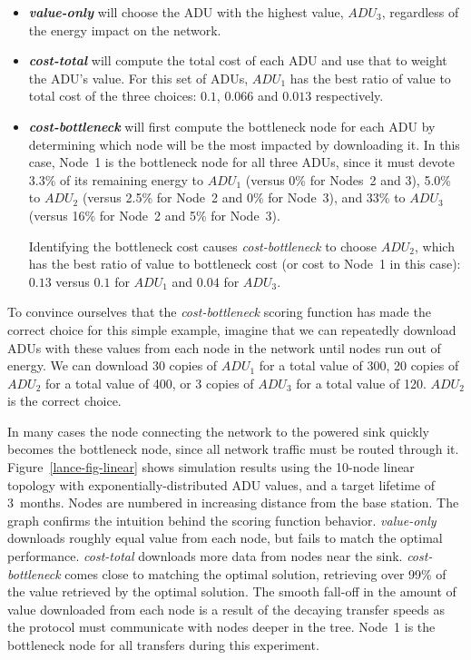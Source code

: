 \begin{itemize}

\item \textbf{\textit{value-only}} will choose the ADU with the highest
value, $ADU_3$, regardless of the energy impact on the network.

\item \textbf{\textit{cost-total}} will compute the total cost of each ADU
and use that to weight the ADU's value. For this set of ADUs, $ADU_1$ has the
best ratio of value to total cost of the three choices: $0.1$, $0.066$ and
$0.013$ respectively.

\item \textbf{\textit{cost-bottleneck}} will first compute the bottleneck
node for each ADU by determining which node will be the most impacted by
downloading it. In this case, Node~1 is the bottleneck node for all three
ADUs, since it must devote 3.3\% of its remaining energy to $ADU_1$ (versus
0\% for Nodes~2 and 3), 5.0\% to $ADU_2$ (versus 2.5\% for Node~2 and 0\% for
Node~3), and 33\% to $ADU_3$ (versus 16\% for Node~2 and 5\% for Node~3).

Identifying the bottleneck cost causes \textit{cost-bottleneck} to choose
$ADU_2$, which has the best ratio of value to  bottleneck cost (or cost to Node~1 in
this case): $0.13$ versus $0.1$ for $ADU_1$ and $0.04$ for $ADU_3$.

\end{itemize}

To convince ourselves that the \textit{cost-bottleneck} scoring function has
made the correct choice for this simple example, imagine that we can
repeatedly download ADUs with these values from each node in the network
until nodes run out of energy. We can download 30 copies of $ADU_1$ for a
total value of 300, 20 copies of $ADU_2$ for a total value of 400, or 3
copies of $ADU_3$ for a total value of 120. $ADU_2$ is the correct choice.

In many cases the node connecting the network to the powered sink quickly
becomes the bottleneck node, since all network traffic must be routed through
it. Figure~\ref{lance-fig-linear} shows simulation results using the 10-node
linear topology with exponentially-distributed ADU values, and a target
lifetime of 3~months. Nodes are numbered in increasing distance from the base
station. The graph confirms the intuition behind the scoring function
behavior. \textit{value-only} downloads roughly equal value from each node,
but fails to match the optimal performance. \textit{cost-total} downloads
more data from nodes near the sink. \textit{cost-bottleneck} comes close to
matching the optimal solution, retrieving over 99\% of the value retrieved by
the optimal solution. The smooth fall-off in the amount of value downloaded
from each node is a result of the decaying transfer speeds as the protocol
must communicate with nodes deeper in the tree. Node~1 is the bottleneck node
for all transfers during this experiment.

